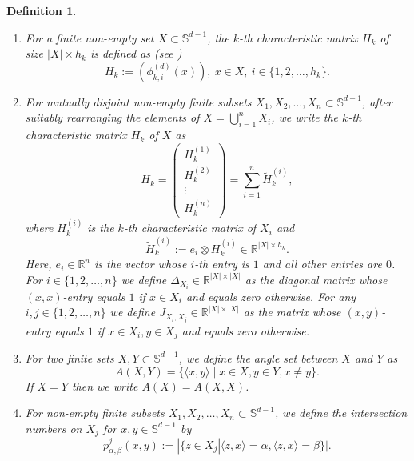 \documentclass[11pt]{article}
\newtheorem{definition}{Definition}[section]
\theoremstyle{definition}
\theoremstyle{remark}
\begin{document}
\begin{definition}\label{alldef}
\begin{enumerate}
\item[{\rm (i)}] 
For a finite non-empty set $X\subset\mathbb{S}^{d-1}$, the $k$-th characteristic matrix ${H}_k$ of size $|X|\times h_k$ is defined as  {\rm (see \cite[Definition 3.4]{DGS77})}
\begin{equation*}
{H}_k:=(\phi_{k,i}^{(d)}({x})), \   {x}\in X,\ i\in\{1,2,\ldots,h_k\}.
\end{equation*}

\item[{\rm (ii)}] For mutually disjoint non-empty finite subsets $X_1, X_2,\ldots, X_n\subset \mathbb{S}^{d-1}$, after suitably rearranging the elements of $X=\bigcup_{i=1}^{n}X_i$, we write the $k$-th characteristic matrix $  {H}_{k}$ of $X$ as
\begin{equation*}
{H}_{k}=\begin{pmatrix}
{H}_{k}^{(1)}\\
{H}_{k}^{(2)}\\
\vdots \\
{H}_{k}^{(n)}
\end{pmatrix}=\sum_{i=1}^n  \widetilde{H}_{k}^{(i)},
\end{equation*}
where ${H}_{k}^{(i)}$ is the $k$-th characteristic matrix of $X_i$ and
\begin{equation*}
\widetilde{H}_{k}^{(i)}:=  {e}_i \otimes  {H}_{k}^{(i)}\in\mathbb{R}^{|X|\times h_k}.
\end{equation*}
Here, ${e}_i\in\mathbb{R}^{n}$ is the vector whose $i$-th entry is $1$ and all other entries are $0$. 
For $i\in\{1,2,\ldots,n\}$ we define $  \Delta_{X_i}\in\mathbb{R}^{|X|\times |X|}$ as the diagonal matrix whose $(  {x},  {x})$-entry equals $1$ if $  {x}\in X_i$ and equals zero otherwise. For any $i,j\in\{1,2,\ldots,n\}$ we define $ {J}_{X_i,X_j}\in\mathbb{R}^{|X|\times |X|}$ as the matrix whose $(  {x},  {y})$-entry equals $1$ if $  {x}\in X_i,   {y}\in X_j$ and equals zero otherwise.  

\item[{\rm (iii)}] For two finite sets $X,Y\subset \mathbb{S}^{d-1}$, we define the angle set between $X$ and $Y$ as 
\begin{equation*}
A(X,Y)=\{\langle   {x},  {y}\rangle \mid   {x}\in X,  {y}\in Y,   {x}\neq   {y}\}.
\end{equation*}
If $X=Y$ then we write $A(X)=A(X,X)$.

\item[{\rm (iv)}] For non-empty finite subsets $X_1, X_2,\ldots, X_n\subset \mathbb{S}^{d-1}$, we define the intersection numbers on $X_j$ for $  {x},  {y} \in  \mathbb{S}^{d-1}$ by
\begin{equation*}
p^j_{\alpha,\beta}(  {x},   {y}):=| \{   {z}\in X_j | \langle   {z},  {x}\rangle =\alpha,  \langle   {z},  {x}\rangle =\beta  \} |.
\end{equation*}

\end{enumerate}


\end{definition}
\end{document}

